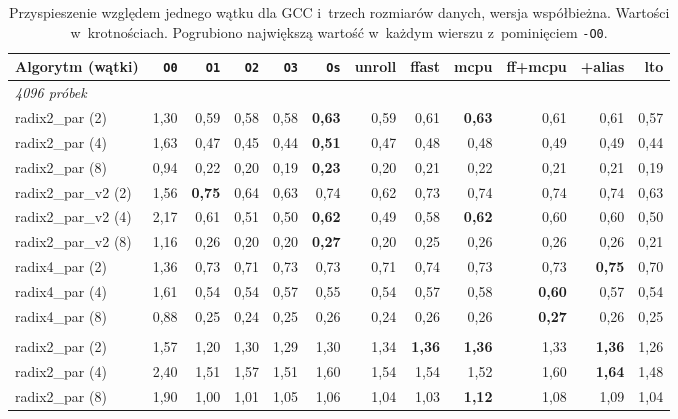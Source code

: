 \begin{table}[H]
\centering
\caption{Przyspieszenie względem jednego wątku dla GCC i~trzech rozmiarów danych, wersja współbieżna. Wartości w~krotnościach. Pogrubiono największą wartość w~każdym wierszu z~pominięciem \texttt{-O0}.}
\label{tab:par-skal-gcc-merged}
\scriptsize
\setlength{\tabcolsep}{3.0pt}
\begin{tabular}{lrrrrrrrrrrr}
\toprule
Algorytm (wątki) & \texttt{O0} & \texttt{O1} & \texttt{O2} & \texttt{O3} & \texttt{Os} & unroll & ffast & mcpu & ff+mcpu & +alias & lto \\
\midrule
\multicolumn{12}{l}{\textit{4096 próbek}} \\[2pt]
radix2\_par (2) & 1,30 & 0,59 & 0,58 & 0,58 & \textbf{0,63} & 0,59 & 0,61 & \textbf{0,63} & 0,61 & 0,61 & 0,57 \\
radix2\_par (4) & 1,63 & 0,47 & 0,45 & 0,44 & \textbf{0,51} & 0,47 & 0,48 & 0,48 & 0,49 & 0,49 & 0,44 \\
radix2\_par (8) & 0,94 & 0,22 & 0,20 & 0,19 & \textbf{0,23} & 0,20 & 0,21 & 0,22 & 0,21 & 0,21 & 0,19 \\
\addlinespace
radix2\_par\_v2 (2) & 1,56 & \textbf{0,75} & 0,64 & 0,63 & 0,74 & 0,62 & 0,73 & 0,74 & 0,74 & 0,74 & 0,63 \\
radix2\_par\_v2 (4) & 2,17 & 0,61 & 0,51 & 0,50 & \textbf{0,62} & 0,49 & 0,58 & \textbf{0,62} & 0,60 & 0,60 & 0,50 \\
radix2\_par\_v2 (8) & 1,16 & 0,26 & 0,20 & 0,20 & \textbf{0,27} & 0,20 & 0,25 & 0,26 & 0,26 & 0,26 & 0,21 \\
\addlinespace
radix4\_par (2) & 1,36 & 0,73 & 0,71 & 0,73 & 0,73 & 0,71 & 0,74 & 0,73 & 0,73 & \textbf{0,75} & 0,70 \\
radix4\_par (4) & 1,61 & 0,54 & 0,54 & 0,57 & 0,55 & 0,54 & 0,57 & 0,58 & \textbf{0,60} & 0,57 & 0,54 \\
radix4\_par (8) & 0,88 & 0,25 & 0,24 & 0,25 & 0,26 & 0,24 & 0,26 & 0,26 & \textbf{0,27} & 0,26 & 0,25 \\
\addlinespace
\multicolumn{12}{l}{\textit{65536 próbek}} \\[2pt]
radix2\_par (2) & 1,57 & 1,20 & 1,30 & 1,29 & 1,30 & 1,34 & \textbf{1,36} & \textbf{1,36} & 1,33 & \textbf{1,36} & 1,26 \\
radix2\_par (4) & 2,40 & 1,51 & 1,57 & 1,51 & 1,60 & 1,54 & 1,54 & 1,52 & 1,60 & \textbf{1,64} & 1,48 \\
radix2\_par (8) & 1,90 & 1,00 & 1,01 & 1,05 & 1,06 & 1,04 & 1,03 & \textbf{1,12} & 1,08 & 1,09 & 1,04 \\

\end{tabular}
\end{table}
